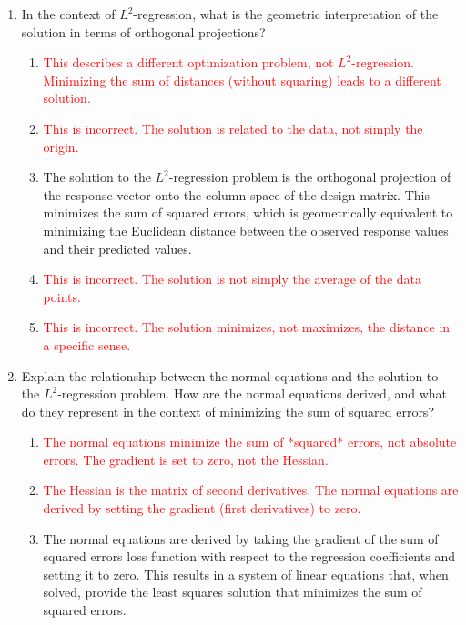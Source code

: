\documentclass{article}%
\newcommand{\incorrect}[1]{\textcolor{red}{#1}}
\begin{document}
\begin{enumerate}
\begin{enumerate}
\item \incorrect{The average of the data points is only relevant in simple cases and doesn't generally represent the $L^2$-regression solution.}%
\end{enumerate}%
\vspace{1em}%
\item In the context of $L^2$-regression, what is the geometric interpretation of the solution in terms of orthogonal projections?%
\begin{enumerate}%
\item \incorrect{This describes a different optimization problem, not $L^2$-regression.  Minimizing the sum of distances (without squaring) leads to a different solution.}%
\item \incorrect{This is incorrect. The solution is related to the data, not simply the origin.}%
\item The solution to the $L^2$-regression problem is the orthogonal projection of the response vector onto the column space of the design matrix. This minimizes the sum of squared errors, which is geometrically equivalent to minimizing the Euclidean distance between the observed response values and their predicted values.%
\item \incorrect{This is incorrect. The solution is not simply the average of the data points.}%
\item \incorrect{This is incorrect. The solution minimizes, not maximizes, the distance in a specific sense.}%
\end{enumerate}%
\vspace{1em}%
\item Explain the relationship between the normal equations and the solution to the $L^2$-regression problem. How are the normal equations derived, and what do they represent in the context of minimizing the sum of squared errors?%
\begin{enumerate}%
\item \incorrect{The normal equations minimize the sum of *squared* errors, not absolute errors.  The gradient is set to zero, not the Hessian.}%
\item \incorrect{The Hessian is the matrix of second derivatives.  The normal equations are derived by setting the gradient (first derivatives) to zero.}%
\item The normal equations are derived by taking the gradient of the sum of squared errors loss function with respect to the regression coefficients and setting it to zero. This results in a system of linear equations that, when solved, provide the least squares solution that minimizes the sum of squared errors.%

\end{enumerate}
\end{enumerate}
\end{document}

